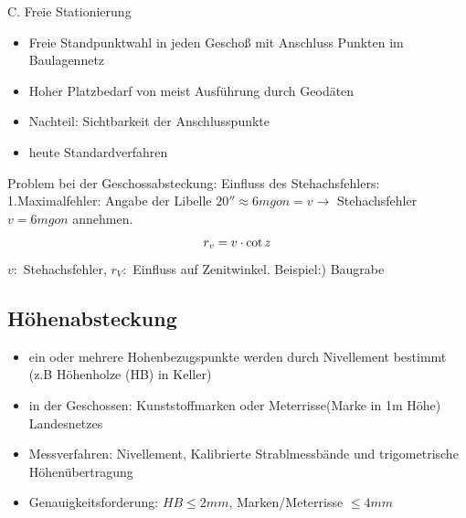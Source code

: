 \documentclass[12pt]{article}
\begin{document}
C. Freie Stationierung
\begin{itemize}
\item Freie Standpunktwahl in jeden Geschoß mit Anschluss Punkten im Baulagennetz
\item Hoher Platzbedarf von meist Ausführung durch Geodäten
\item Nachteil: Sichtbarkeit der Anschlusspunkte
\item heute Standardverfahren
\end{itemize}
Problem bei der Geschossabsteckung:
Einfluss des Stehachsfehlers: 1.Maximalfehler: Angabe der Libelle $20'' \approx 6mgon = v \longrightarrow$ Stehachsfehler $v=6mgon$ annehmen. \newline
\begin{equation*}
r_v = v \cdot \cot z \\
\end{equation*}
$v:$ Stehachsfehler, $r_V:$ Einfluss auf Zenitwinkel. \newline
Beispiel:) Baugrabe
\begin{figure}[ht]\centering
\end{figure}
\newline
\begin{figure}[ht]\centering
\end{figure}
\subsection{Höhenabsteckung}
\begin{itemize}
\item ein oder mehrere Hohenbezugspunkte werden durch Nivellement bestimmt (z.B Höhenholze (HB) in Keller)
\item in der Geschossen: Kunststoffmarken oder Meterrisse(Marke in 1m Höhe) Landesnetzes
\item Messverfahren: Nivellement, Kalibrierte Strablmessbände und trigometrische Höhenübertragung
\item Genauigkeitsforderung: $HB \leq 2mm$, Marken/Meterrisse $\leq 4mm$ 
\end{itemize}
\end{document}
